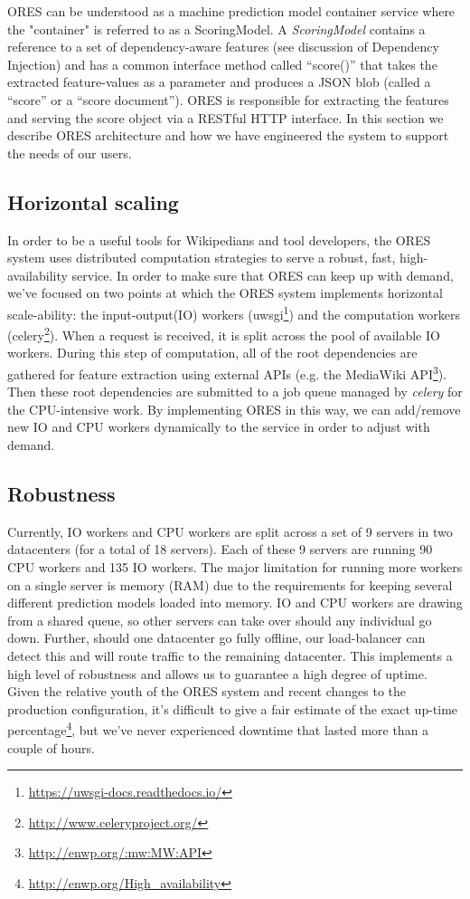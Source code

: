 
ORES can be understood as a machine prediction model container service where the "container" is referred to as a ScoringModel.  A \emph{ScoringModel} contains a reference to a set of dependency-aware features (see discussion of Dependency Injection) and has a common interface method called ``score()'' that takes the extracted feature-values as a parameter and produces a JSON blob (called a ``score'' or a ``score document'').  ORES is responsible for extracting the features and serving the score object via a RESTful HTTP interface.  In this section we describe ORES architecture and how we have engineered the system to support the needs of our users.

\subsection{Horizontal scaling}
In order to be a useful tools for Wikipedians and tool developers, the ORES system uses distributed computation strategies to serve a robust, fast, high-availability service.   In order to make sure that ORES can keep up with demand, we've focused on  two points at which the ORES system implements horizontal scale-ability: the input-output(IO) workers (uwsgi\footnote{\url{https://uwsgi-docs.readthedocs.io/}}) and the computation workers (celery\footnote{\url{http://www.celeryproject.org/}}).  When a request is received, it is split across the pool of available IO workers.  During this step of computation, all of the root dependencies are gathered for feature extraction using external APIs (e.g. the MediaWiki API\footnote{\url{http://enwp.org/:mw:MW:API}}).  Then these root dependencies are submitted to a job queue managed by \emph{celery} for the CPU-intensive work.  By implementing ORES in this way, we can add/remove new IO and CPU workers dynamically to the service in order to adjust with demand.

\subsection{Robustness}
Currently, IO workers and CPU workers are split across a set of 9 servers in two datacenters (for a total of 18 servers).  Each of these 9 servers are running 90 CPU workers and 135 IO workers.  The major limitation for running more workers on a single server is memory (RAM) due to the requirements for keeping several different prediction models loaded into memory.  IO and CPU workers are drawing from a shared queue, so other servers can take over should any individual go down.  Further, should one datacenter go fully offline, our load-balancer can detect this and will route traffic to the remaining datacenter.  This implements a high level of robustness and allows us to guarantee a high degree of uptime.  Given the relative youth of the ORES system and recent changes to the production configuration, it's difficult to give a fair estimate of the exact up-time percentage\footnote{\url{http://enwp.org/High_availability}}, but we've never experienced downtime that lasted more than a couple of hours.

